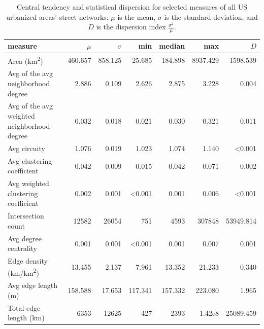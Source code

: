 \documentclass[11pt]{article}
\begin{document}
\begin{multicols}{2}
\begin{table}[htbp]
\centering
\caption{Central tendency and statistical dispersion for selected measures of all US urbanized areas' street networks: $\mu$ is the mean, $\sigma$ is the standard deviation, and $D$ is the dispersion index $\frac{\sigma ^ 2}{\mu}$.}
\label{tab:measures_urban_areas}
\small
\begin{tabular}{ l r r r r r r }
	\toprule
	measure                                          & $\mu$          & $\sigma$       & min            & median         & max            & $D$            \\
	\midrule
	Area (km\textsuperscript{2})                     & 460.657        & 858.125        & 25.685         & 184.898        & 8937.429       & 1598.539       \\
	Avg of the avg neighborhood degree               & 2.886          & 0.109          & 2.626          & 2.875          & 3.228          & 0.004          \\
	Avg of the avg weighted neighborhood degree      & 0.032          & 0.018          & 0.021          & 0.030          & 0.321          & 0.011          \\
	Avg circuity                                     & 1.076          & 0.019          & 1.023          & 1.074          & 1.140          & \textless0.001 \\
	Avg clustering coefficient                       & 0.042          & 0.009          & 0.015          & 0.042          & 0.071          & 0.002          \\
	Avg weighted clustering coefficient              & 0.002          & 0.001          & \textless0.001 & 0.001          & 0.006          & \textless0.001 \\
	Intersection count                               & 12582          & 26054          & 751            & 4593           & 307848         & 53949.814      \\
	Avg degree centrality                            & 0.001          & 0.001          & \textless0.001 & 0.001          & 0.007          & 0.001          \\
	Edge density (km/km\textsuperscript{2})          & 13.455         & 2.137          & 7.961          & 13.352         & 21.233         & 0.340          \\
	Avg edge length (m)                              & 158.588        & 17.653         & 117.341        & 157.332        & 223.080        & 1.965          \\
	Total edge length (km)                           & 6353           & 12625          & 427            & 2393           & 1.42e8         & 25089.459      \\

\end{tabular}
\end{table}
\end{multicols}
\end{document}
